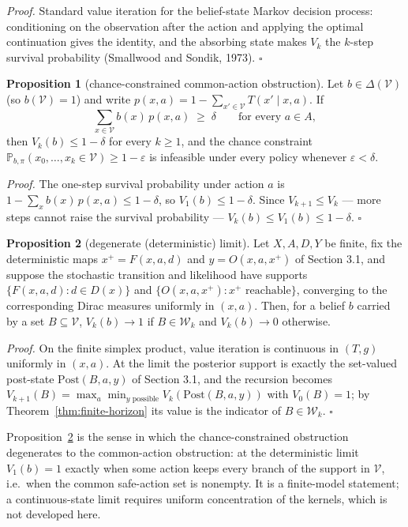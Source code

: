 \documentclass[10pt,twocolumn]{article}
\theoremstyle{definition}
\newtheorem{proposition}{Proposition}
\begin{document}
\emph{Proof.} Standard value iteration for the belief-state Markov decision process: conditioning on the observation after the action and applying the optimal continuation gives the identity, and the absorbing state makes \(V_{k}\) the \(k\)-step survival probability (Smallwood and Sondik, 1973). \hfill\(\square\)

\begin{proposition}[chance-constrained common-action obstruction]\label{prop:chance}
Let \(b \in \Delta(\mathcal{V})\) (so \(b(\mathcal{V}) = 1\)) and write \(p(x,a) = 1 - \sum_{x' \in \mathcal{V}} T(x' \mid x, a)\). If
\[
\sum_{x \in \mathcal{V}} b(x)\, p(x,a) \;\ge\; \delta \qquad \text{for every } a \in A,
\]
then \(V_{k}(b) \le 1 - \delta\) for every \(k \ge 1\), and the chance constraint \(\mathbb{P}_{b,\pi}(x_{0}, \dots, x_{k} \in \mathcal{V}) \ge 1 - \varepsilon\) is infeasible under every policy whenever \(\varepsilon < \delta\).
\end{proposition}

\emph{Proof.} The one-step survival probability under action \(a\) is \(1 - \sum_{x} b(x)\, p(x,a) \le 1 - \delta\), so \(V_{1}(b) \le 1 - \delta\). Since \(V_{k+1} \le V_{k}\) --- more steps cannot raise the survival probability --- \(V_{k}(b) \le V_{1}(b) \le 1 - \delta\). \hfill\(\square\)

\begin{proposition}[degenerate (deterministic) limit]\label{prop:degenerate}
Let \(X, A, D, Y\) be finite, fix the deterministic maps \(x^{+} = F(x,a,d)\) and \(y = O(x,a,x^{+})\) of Section 3.1, and suppose the stochastic transition and likelihood have supports \(\{F(x,a,d) : d \in D(x)\}\) and \(\{O(x,a,x^{+}) : x^{+} \text{ reachable}\}\), converging to the corresponding Dirac measures uniformly in \((x,a)\). Then, for a belief \(b\) carried by a set \(B \subseteq \mathcal{V}\), \(V_{k}(b) \to 1\) if \(B \in \mathcal{W}_{k}\) and \(V_{k}(b) \to 0\) otherwise.
\end{proposition}

\emph{Proof.} On the finite simplex product, value iteration is continuous in \((T, g)\) uniformly in \((x,a)\). At the limit the posterior support is exactly the set-valued post-state \(\mathrm{Post}(B, a, y)\) of Section 3.1, and the recursion becomes \(V_{k+1}(B) = \max_{a} \min_{y \text{ possible}} V_{k}(\mathrm{Post}(B,a,y))\) with \(V_{0}(B) = 1\); by Theorem~\ref{thm:finite-horizon} its value is the indicator of \(B \in \mathcal{W}_{k}\). \hfill\(\square\)

Proposition~\ref{prop:degenerate} is the sense in which the chance-constrained obstruction degenerates to the common-action obstruction: at the deterministic limit \(V_{1}(b) = 1\) exactly when some action keeps every branch of the support in \(\mathcal{V}\), i.e.\ when the common safe-action set is nonempty. It is a finite-model statement; a continuous-state limit requires uniform concentration of the kernels, which is not developed here.
\end{document}
